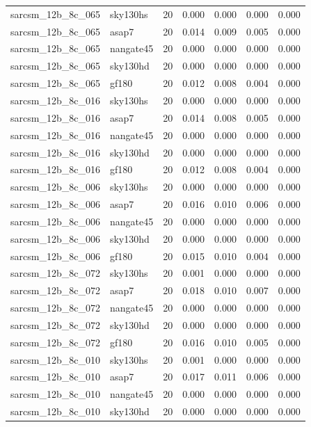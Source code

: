 \begin{tabular}{llrrrrr}
sarcsm\_12b\_8c\_065 & sky130hs & 20 & 0.000 & 0.000 & 0.000 & 0.000 \\
sarcsm\_12b\_8c\_065 & asap7 & 20 & 0.014 & 0.009 & 0.005 & 0.000 \\
sarcsm\_12b\_8c\_065 & nangate45 & 20 & 0.000 & 0.000 & 0.000 & 0.000 \\
sarcsm\_12b\_8c\_065 & sky130hd & 20 & 0.000 & 0.000 & 0.000 & 0.000 \\
sarcsm\_12b\_8c\_065 & gf180 & 20 & 0.012 & 0.008 & 0.004 & 0.000 \\
sarcsm\_12b\_8c\_016 & sky130hs & 20 & 0.000 & 0.000 & 0.000 & 0.000 \\
sarcsm\_12b\_8c\_016 & asap7 & 20 & 0.014 & 0.008 & 0.005 & 0.000 \\
sarcsm\_12b\_8c\_016 & nangate45 & 20 & 0.000 & 0.000 & 0.000 & 0.000 \\
sarcsm\_12b\_8c\_016 & sky130hd & 20 & 0.000 & 0.000 & 0.000 & 0.000 \\
sarcsm\_12b\_8c\_016 & gf180 & 20 & 0.012 & 0.008 & 0.004 & 0.000 \\
sarcsm\_12b\_8c\_006 & sky130hs & 20 & 0.000 & 0.000 & 0.000 & 0.000 \\
sarcsm\_12b\_8c\_006 & asap7 & 20 & 0.016 & 0.010 & 0.006 & 0.000 \\
sarcsm\_12b\_8c\_006 & nangate45 & 20 & 0.000 & 0.000 & 0.000 & 0.000 \\
sarcsm\_12b\_8c\_006 & sky130hd & 20 & 0.000 & 0.000 & 0.000 & 0.000 \\
sarcsm\_12b\_8c\_006 & gf180 & 20 & 0.015 & 0.010 & 0.004 & 0.000 \\
sarcsm\_12b\_8c\_072 & sky130hs & 20 & 0.001 & 0.000 & 0.000 & 0.000 \\
sarcsm\_12b\_8c\_072 & asap7 & 20 & 0.018 & 0.010 & 0.007 & 0.000 \\
sarcsm\_12b\_8c\_072 & nangate45 & 20 & 0.000 & 0.000 & 0.000 & 0.000 \\
sarcsm\_12b\_8c\_072 & sky130hd & 20 & 0.000 & 0.000 & 0.000 & 0.000 \\
sarcsm\_12b\_8c\_072 & gf180 & 20 & 0.016 & 0.010 & 0.005 & 0.000 \\
sarcsm\_12b\_8c\_010 & sky130hs & 20 & 0.001 & 0.000 & 0.000 & 0.000 \\
sarcsm\_12b\_8c\_010 & asap7 & 20 & 0.017 & 0.011 & 0.006 & 0.000 \\
sarcsm\_12b\_8c\_010 & nangate45 & 20 & 0.000 & 0.000 & 0.000 & 0.000 \\
sarcsm\_12b\_8c\_010 & sky130hd & 20 & 0.000 & 0.000 & 0.000 & 0.000 \\

\end{tabular}
